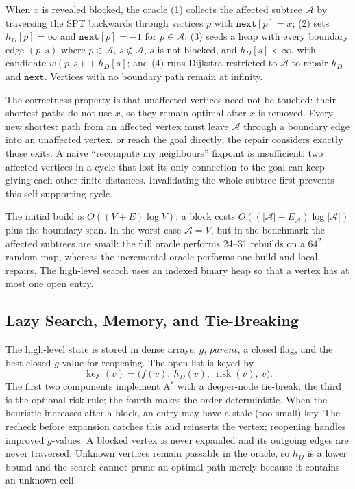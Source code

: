 \documentclass[conference]{IEEEtran}
\newcommand{\hD}{h_{D}}
\begin{document}
When $x$ is revealed blocked, the oracle (1) collects the affected subtree $\mathcal{A}$ by traversing the SPT backwards through vertices $p$ with $\texttt{next}[p]=x$; (2) sets $\hD[p]=\infty$ and $\texttt{next}[p]=-1$ for $p\in\mathcal{A}$; (3) seeds a heap with every boundary edge $(p,s)$ where $p\in\mathcal{A}$, $s\notin\mathcal{A}$, $s$ is not blocked, and $\hD[s]<\infty$, with candidate $w(p,s)+\hD[s]$; and (4) runs Dijkstra restricted to $\mathcal{A}$ to repair $\hD$ and $\texttt{next}$. Vertices with no boundary path remain at infinity.

The correctness property is that unaffected vertices need not be touched: their shortest paths do not use $x$, so they remain optimal after $x$ is removed. Every new shortest path from an affected vertex must leave $\mathcal{A}$ through a boundary edge into an unaffected vertex, or reach the goal directly; the repair considers exactly those exits. A naive ``recompute my neighbours'' fixpoint is insufficient: two affected vertices in a cycle that lost its only connection to the goal can keep giving each other finite distances. Invalidating the whole subtree first prevents this self-supporting cycle.

The initial build is $O((V+E)\log V)$; a block costs $O((|\mathcal{A}|+E_{\mathcal{A}})\log|\mathcal{A}|)$ plus the boundary scan. In the worst case $\mathcal{A}=V$, but in the benchmark the affected subtrees are small: the full oracle performs 24--31 rebuilds on a $64^2$ random map, whereas the incremental oracle performs one build and local repairs. The high-level search uses an indexed binary heap so that a vertex has at most one open entry.

\subsection{Lazy Search, Memory, and Tie-Breaking}
The high-level state is stored in dense arrays: $g$, $\textit{parent}$, a closed flag, and the best closed $g$-value for reopening. The open list is keyed by
\begin{equation}
\operatorname{key}(v)=\bigl(f(v),\ \hD(v),\ \operatorname{risk}(v),\ v\bigr).
\end{equation}
The first two components implement A$^*$ with a deeper-node tie-break; the third is the optional risk rule; the fourth makes the order deterministic. When the heuristic increases after a block, an entry may have a stale (too small) key. The recheck before expansion catches this and reinserts the vertex; reopening handles improved $g$-values. A blocked vertex is never expanded and its outgoing edges are never traversed. Unknown vertices remain passable in the oracle, so $\hD$ is a lower bound and the search cannot prune an optimal path merely because it contains an unknown cell.
\end{document}
